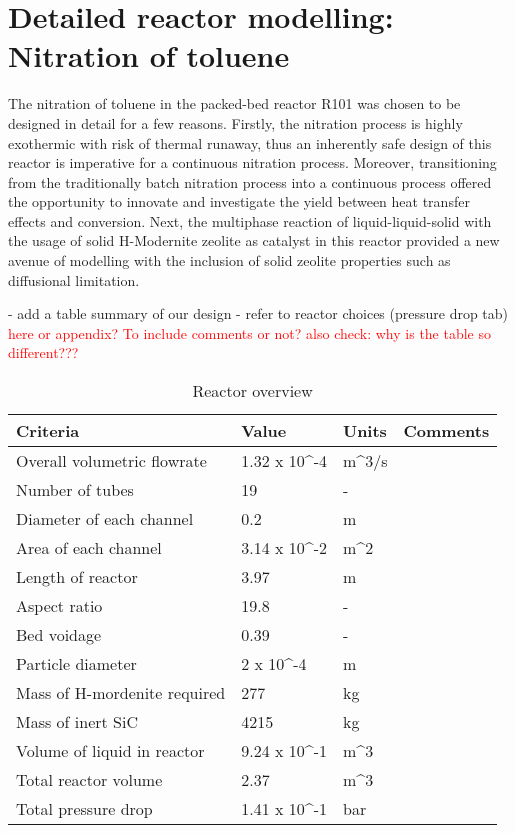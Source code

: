 \section{Detailed reactor modelling: Nitration of toluene}
The nitration of toluene in the packed-bed reactor R101 was chosen to be designed in detail for a few reasons. Firstly, the nitration process is highly exothermic with risk of thermal runaway, thus an inherently safe design of this reactor is imperative for a continuous nitration process. Moreover, transitioning from the traditionally batch nitration process into a continuous process offered the opportunity to innovate and investigate the yield between heat transfer effects and conversion. Next, the multiphase reaction of liquid-liquid-solid with the usage of solid H-Modernite zeolite as catalyst in this reactor provided a new avenue of modelling with the inclusion of solid zeolite properties such as diffusional limitation. 

- add a table summary of our design - refer to reactor choices (pressure drop tab) \textcolor{red}{here or appendix? To include comments or not?}
\textcolor{red}{also check: why is the table so different???}
\begin{table}[H]
\centering
\caption{Reactor overview}
\label{tab:reactoroverview}
\begin{tabular}{@{}llll@{}}
\toprule
Criteria                     & Value        & Units & Comments \\ \midrule
Overall volumetric flowrate  & 1.32 x 10^-4 & m^3/s &          \\
Number of tubes              & 19           & -     &          \\
Diameter of each channel     & 0.2          & m     &          \\
Area of each channel         & 3.14 x 10^-2 & m^2   &          \\
Length of reactor            & 3.97         & m     &          \\
Aspect ratio                 & 19.8         & -     &          \\
Bed voidage                  & 0.39         & -     &          \\
Particle diameter            & 2 x 10^-4    & m     &          \\
Mass of H-mordenite required & 277          & kg    &          \\
Mass of inert SiC            & 4215         & kg    &          \\
Volume of liquid in reactor  & 9.24 x 10^-1 & m^3   &          \\
Total reactor volume         & 2.37         & m^3   &          \\
Total pressure drop          & 1.41 x 10^-1 & bar   &          \\ \bottomrule
\end{tabular}
\end{table}

